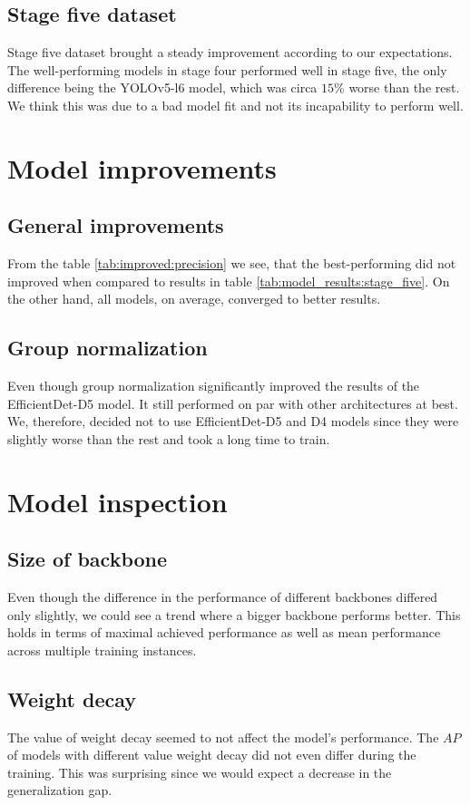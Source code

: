 \subsection{Stage five dataset}

Stage five dataset brought a steady improvement according to our expectations. The well-performing models in stage four performed well in stage five, the only difference being the YOLOv5-l6 model, which was circa $15\%$ worse than the rest. We think this was due to a bad model fit and not its incapability to perform well.

\section{Model improvements}
\subsection{General improvements}
From the table \ref{tab:improved:precision} we see, that the best-performing did not improved when compared to results in table \ref{tab:model_results:stage_five}. On the other hand, all models, on average, converged to better results.

\subsection{Group normalization}
Even though group normalization significantly improved the results of the EfficientDet-D5 model. It still performed on par with other architectures at best. We, therefore, decided not to use EfficientDet-D5 and D4 models since they were slightly worse than the rest and took a long time to train.

\section{Model inspection}
\subsection{Size of backbone}
Even though the difference in the performance of different backbones differed only slightly, we could see a trend where a bigger backbone performs better. This holds in terms of maximal achieved performance as well as mean performance across multiple training instances.

\subsection{Weight decay}
The value of weight decay seemed to not affect the model's performance. The $AP$ of models with different value weight decay did not even differ during the training. This was surprising since we would expect a decrease in the generalization gap.

